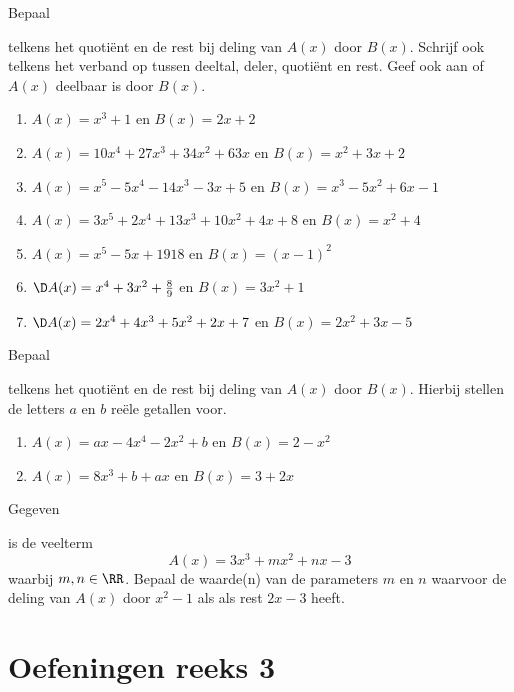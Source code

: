 \documentclass{ximera}
\begin{document}
\begin{Oefening}\setcounter{enumi}{11} 
\hypertarget{oef2.11}{Bepaal} telkens het quoti\"ent en de rest bij deling van $A(x)$ door $B(x)$. Schrijf ook telkens het verband op tussen deeltal, deler, quoti\"ent en rest. Geef ook aan of $A(x)$ deelbaar is door $B(x)$.
\begin{enumerate}
\item 
$A(x) = x^3+1$ \quad en \quad $B(x) = 2x+2$
\item
$A(x) = 10x^4 + 27x^3 + 34x^2 + 63x$ \quad en \quad $B(x) = x^2 + 3x + 2$ 
\item
$A(x) = x^5 - 5x^4 - 14x^3 - 3x + 5$ \quad en \quad $B(x) = x^3 - 5x^2 + 6x - 1$ 
\item
$A(x) = 3x^5 + 2x^4 + 13x^3 + 10x^2 + 4x + 8$ \quad en \quad $B(x) = x^2 + 4$ 
\item
$A(x) = x^5 - 5x + 1918$ \quad en \quad $B(x) = (x-1)^2$ 
\item
$\D A(x) = x^4 + 3x^2 + \frac{8}{9}$ en $B(x) = 3x^2 + 1$ 
\item
$\D A(x) = 2x^4 + 4x^3 + 5x^2 + 2x + 7$ en $B(x) = 2x^2+3x-5$ 
\end{enumerate}
\end{Oefening}

\begin{Oefening}\setcounter{enumi}{12} 
\hypertarget{oef2.12}{Bepaal} telkens het quoti\"ent en de rest bij deling van $A(x)$ door $B(x)$. Hierbij stellen de letters $a$ en $b$ re\"ele getallen voor. 
\begin{enumerate}
\item
$A(x) = ax - 4x^4 - 2x^2 + b$ en $B(x) = 2-x^2$ 
\item
$A(x) = 8x^3 + b + ax$ \quad en \quad $B(x) = 3+2x$ 
\end{enumerate}
\end{Oefening}

\begin{Oefening}\setcounter{enumi}{13} 
\hypertarget{oef2.13}{Gegeven} is de veelterm
\[
A(x) = 3x^3 + mx^2 + nx - 3
\]
waarbij $m,n \in \RR$. Bepaal de waarde(n) van de parameters $m$ en $n$ waarvoor de deling van $A(x)$ door $x^2-1$ als als rest $2x-3$ heeft. 
\end{Oefening}

\section*{Oefeningen reeks 3}
\end{document}
